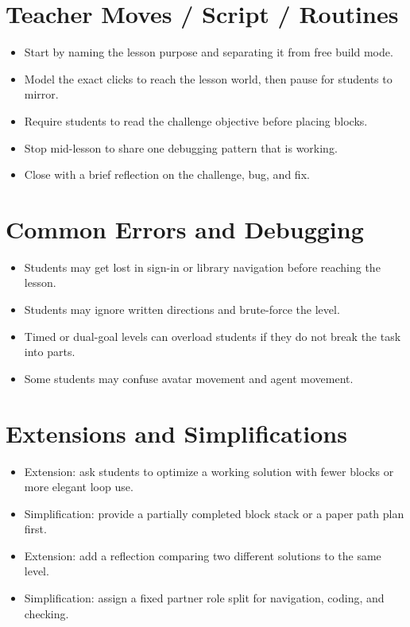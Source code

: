 \documentclass[11pt]{article}
\begin{document}
\section*{Teacher Moves / Script / Routines}
\begin{itemize}[leftmargin=*]
\item Start by naming the lesson purpose and separating it from free build mode.
\item Model the exact clicks to reach the lesson world, then pause for students to mirror.
\item Require students to read the challenge objective before placing blocks.
\item Stop mid-lesson to share one debugging pattern that is working.
\item Close with a brief reflection on the challenge, bug, and fix.
\end{itemize}

\section*{Common Errors and Debugging}
\begin{itemize}[leftmargin=*]
\item Students may get lost in sign-in or library navigation before reaching the lesson.
\item Students may ignore written directions and brute-force the level.
\item Timed or dual-goal levels can overload students if they do not break the task into parts.
\item Some students may confuse avatar movement and agent movement.
\end{itemize}

\section*{Extensions and Simplifications}
\begin{itemize}[leftmargin=*]
\item Extension: ask students to optimize a working solution with fewer blocks or more elegant loop use.
\item Simplification: provide a partially completed block stack or a paper path plan first.
\item Extension: add a reflection comparing two different solutions to the same level.
\item Simplification: assign a fixed partner role split for navigation, coding, and checking.
\end{itemize}
\end{document}
